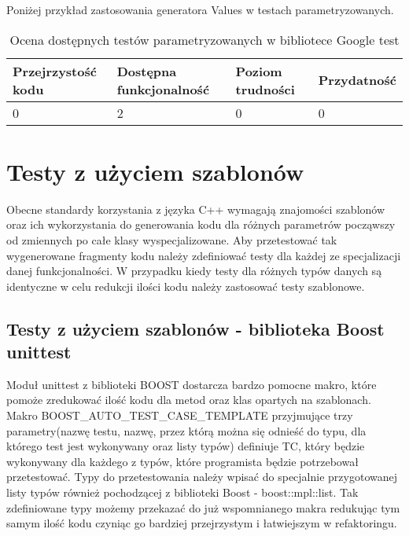 \documentclass[12pt,a4paper,notitlepage]{report}
\begin{document}
Poniżej przykład zastosowania generatora Values w testach parametryzowanych.

			

\begin{center}
			\begin{table}[!ht]
			\caption{Ocena dostępnych testów parametryzowanych w bibliotece Google test}
			\label{}
			\begin{tabular}[!hc]{|l|l|l|l|}
		\hline
		Przejrzystość kodu 	&	Dostępna funkcjonalność	&	Poziom trudności	&	Przydatność \\ \hline
		0					&	2						&	0					& 	0  			\\ \hline
			\end{tabular}
			\end{table} 
		\end{center}

\chapter{Testy z użyciem szablonów}

Obecne standardy korzystania z języka C++ wymagają znajomości szablonów oraz ich wykorzystania do generowania kodu dla różnych parametrów począwszy od zmiennych po całe klasy wyspecjalizowane. Aby przetestować tak wygenerowane fragmenty kodu należy zdefiniować testy dla każdej ze specjalizacji danej funkcjonalności.
W przypadku kiedy testy dla różnych typów danych są identyczne w celu redukcji ilości kodu należy zastosować testy szablonowe.

\section{Testy z użyciem szablonów - biblioteka Boost unittest}

Moduł unittest z biblioteki BOOST dostarcza bardzo pomocne makro, które pomoże zredukować ilość kodu dla metod oraz klas opartych na szablonach. Makro BOOST{\_}AUTO{\_}TEST{\_}CASE{\_}TEMPLATE przyjmujące trzy parametry(nazwę testu, nazwę, przez którą można się odnieść do typu, dla którego test jest wykonywany oraz listy typów) definiuje TC, który będzie wykonywany dla każdego z typów, które programista będzie potrzebował przetestować.
Typy do przetestowania należy wpisać do specjalnie przygotowanej listy typów również pochodzącej z biblioteki Boost - boost::mpl::list. Tak zdefiniowane typy możemy przekazać do już wspomnianego makra redukując tym samym ilość kodu czyniąc go bardziej przejrzystym i łatwiejszym w refaktoringu.
\end{document}
